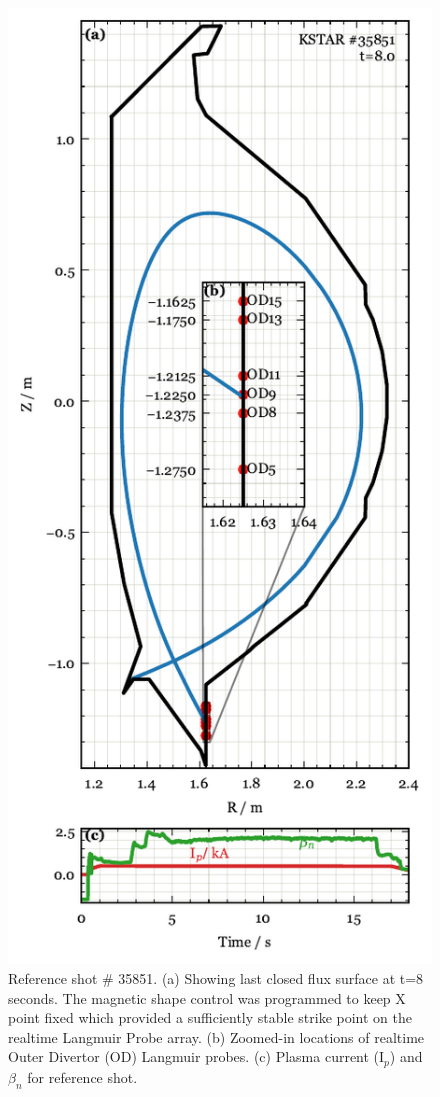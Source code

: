 \begin{figure}[!ht]
 \centering
 \includegraphics[width=\linewidth]{figures/RefShot.pdf}
 \caption{
Reference shot \# 35851.
(a) Showing last closed flux surface at t=8 seconds.
The magnetic shape control was programmed to keep X point fixed which provided a sufficiently stable strike point on the realtime Langmuir Probe array.
(b) Zoomed-in locations of realtime Outer Divertor (OD) Langmuir probes.
(c) Plasma current (I$_p$) and $\beta_n$ for reference shot.
}
 \label{fig:ref_shot}
\end{figure}

